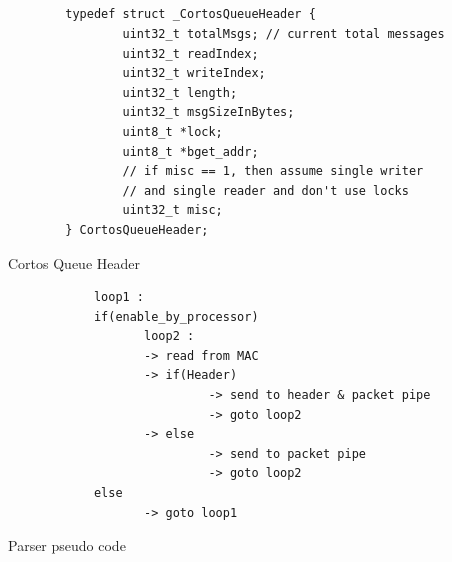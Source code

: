\appendix
\begin{appendices}
\renewcommand{\thechapter}{\Roman{chapter}}

	
\chapter{}
	\begin{algorithm}[htbp]
		\centering
		\begin{verbatim}
		typedef struct _CortosQueueHeader {
		        uint32_t totalMsgs; // current total messages
		        uint32_t readIndex;
		        uint32_t writeIndex;
		        uint32_t length;
		        uint32_t msgSizeInBytes;
		        uint8_t *lock;
		        uint8_t *bget_addr;
		        // if misc == 1, then assume single writer 
		        // and single reader and don't use locks
		        uint32_t misc;
		} CortosQueueHeader;
		\end{verbatim}
		\caption{Cortos Queue Header}
		\label{alg:QueueHDR}
	\end{algorithm}



	\begin{algorithm}[htbp]
		\centering
		\begin{verbatim}
			loop1 :
			if(enable_by_processor)
			       loop2 :
			       -> read from MAC
			       -> if(Header) 
			                -> send to header & packet pipe
			                -> goto loop2
			       -> else
			       	        -> send to packet pipe
			       	        -> goto loop2
			else
			       -> goto loop1
		\end{verbatim}
		\caption{Parser pseudo code}
		\label{alg:ParserCode}
	\end{algorithm}



\end{appendices}
